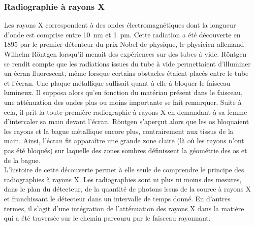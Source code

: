 		\subsubsection{Radiographie à rayons X}
			Les rayons X correspondent à des ondes électromagnétiques dont la longueur d'onde est comprise entre \SI{10}{\nano\meter} et \SI{1}{\pico\meter}. Cette radiation a été découverte en 1895 par le premier détenteur du prix Nobel de physique, le physicien allemand Wilhelm R\"ontgen lorsqu'il menait des expériences sur des tubes à vide. R\"ontgen se rendit compte que les radiations issues du tube à vide permettaient d'illuminer un écran fluorescent, même lorsque certains obstacles étaient placés entre le tube et l'écran. Une plaque métallique suffisait quant à elle à bloquer le faisceau lumineux. Il supposa alors qu'en fonction du matériau présent dans le faisceau, une atténuation des ondes plus ou moins importante se fait remarquer. Suite à cela, il prit la toute première radiographie à rayons X en demandant à sa femme d'intercaler sa main devant l'écran. R\"ontgen s'aperçut alors que les os bloquaient les rayons et la bague métallique encore plus, contrairement aux tissus de la main. Ainsi, l'écran fit apparaître une grande zone claire (là où les rayons n'ont pas été bloqués) sur laquelle des zones sombres définissent la géométrie des os et de la bague.
			\\L'histoire de cette découverte permet à elle seule de comprendre le principe des radiographies à rayons X. Les radiographies sont ni plus ni moins des mesures, dans le plan du détecteur, de la quantité de photons issus de la source à rayons X et franchissant le détecteur dans un intervalle de temps donné. En d'autres termes, il s'agit d'une intégration de l'atténuation des rayons X dans la matière qui a été traversée sur le chemin parcouru par le faisceau rayonnant.
